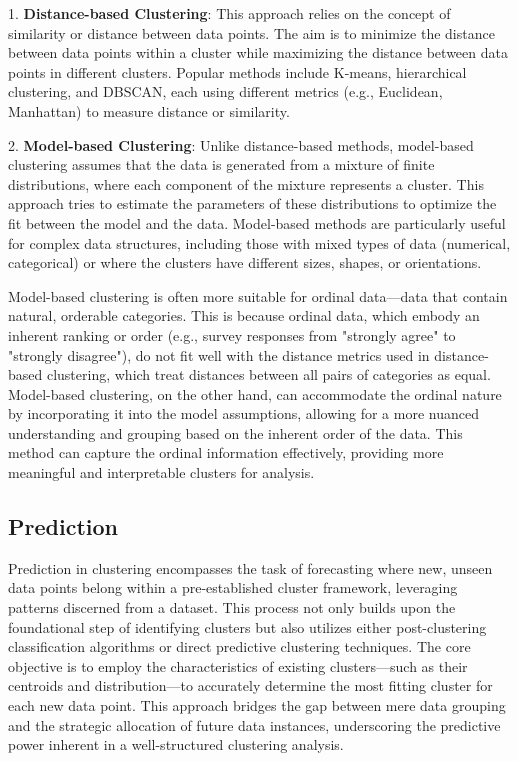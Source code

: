 \documentclass{article}
\begin{document}
1. \textbf{Distance-based Clustering}: This approach relies on the concept of similarity or distance between data points. The aim is to minimize the distance between data points within a cluster while maximizing the distance between data points in different clusters. Popular methods include K-means, hierarchical clustering, and DBSCAN, each using different metrics (e.g., Euclidean, Manhattan) to measure distance or similarity.

2. \textbf{Model-based Clustering}: Unlike distance-based methods, model-based clustering assumes that the data is generated from a mixture of finite distributions, where each component of the mixture represents a cluster. This approach tries to estimate the parameters of these distributions to optimize the fit between the model and the data. Model-based methods are particularly useful for complex data structures, including those with mixed types of data (numerical, categorical) or where the clusters have different sizes, shapes, or orientations.

Model-based clustering is often more suitable for ordinal data—data that contain natural, orderable categories. This is because ordinal data, which embody an inherent ranking or order (e.g., survey responses from "strongly agree" to "strongly disagree"), do not fit well with the distance metrics used in distance-based clustering, which treat distances between all pairs of categories as equal. Model-based clustering, on the other hand, can accommodate the ordinal nature by incorporating it into the model assumptions, allowing for a more nuanced understanding and grouping based on the inherent order of the data. This method can capture the ordinal information effectively, providing more meaningful and interpretable clusters for analysis.

\subsection{Prediction}

Prediction in clustering encompasses the task of forecasting where new, unseen data points belong within a pre-established cluster framework, leveraging patterns discerned from a dataset. This process not only builds upon the foundational step of identifying clusters but also utilizes either post-clustering classification algorithms or direct predictive clustering techniques. The core objective is to employ the characteristics of existing clusters—such as their centroids and distribution—to accurately determine the most fitting cluster for each new data point. This approach bridges the gap between mere data grouping and the strategic allocation of future data instances, underscoring the predictive power inherent in a well-structured clustering analysis.
\end{document}

